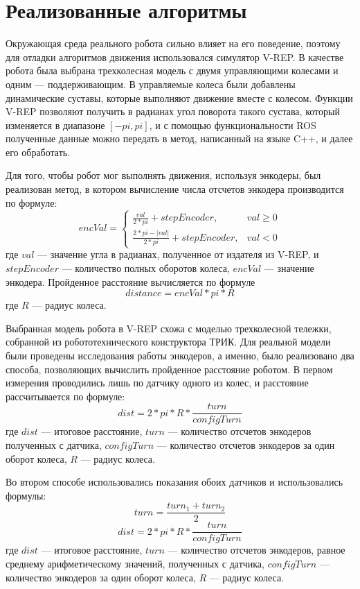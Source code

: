 \documentclass{spisok-article}
\begin{document}
\section{Реализованные алгоритмы}

Окружающая среда реального робота сильно влияет на его поведение, поэтому для отладки алгоритмов движения использовался симулятор V-REP. В качестве робота была выбрана трехколесная модель с двумя управляющими колесами и одним --- поддерживающим. В управляемые колеса  были добавлены динамические суставы, которые выполняют движение вместе с колесом. Функции V-REP позволяют получить в радианах угол поворота такого сустава, который изменяется в диапазоне $[-pi, pi]$, и с помощью функциональности ROS полученные данные можно передать в метод, написанный на языке C++, и далее его обработать. 

Для того, чтобы робот мог выполнять движения, используя энкодеры, был реализован метод, в котором вычисление числа отсчетов энкодера производится по формуле:
\[encVal = \left\{
  \begin{array}{lr}
    \frac{val}{2 * pi} + stepEncoder,               & val \ge 0 \\
    \frac{2 * pi - |val|}{2 * pi} + stepEncoder,  & val < 0
  \end{array}
\right.
\]
где $val$ --- значение угла в радианах, полученное от издателя из V-REP, и $stepEncoder$ --- количество полных оборотов колеса, $encVal$ --- значение энкодера. Пройденное расстояние вычисляется по формуле
$$distance = encVal * pi * R$$
где $R$ --- радиус колеса.

Выбранная модель робота в V-REP схожа с моделью трехколесной тележки, собранной из робототехнического конструктора ТРИК.  Для реальной модели были проведены исследования работы энкодеров, а именно, было реализовано два способа, позволяющих вычислить пройденное расстояние роботом. В первом измерения проводились лишь по датчику одного из колес, и расстояние рассчитывается по формуле:
$$dist = 2 * pi * R * \frac{turn}{configTurn}$$
где $dist$ --- итоговое расстояние, $turn$ --- количество отсчетов энкодеров полученных с датчика, $configTurn$ --- количество отсчетов энкодеров за один оборот колеса, $R$ --- радиус колеса.

Во втором способе использовались показания обоих датчиков и использовались формулы:
$$turn = \frac{turn_1 + turn_2}{2}$$
$$dist = 2 * pi * R * \frac{turn}{configTurn}$$
где $dist$ --- итоговое расстояние, $turn$ --- количество отсчетов энкодеров, равное среднему арифметическому значений, полученных с датчика, $configTurn$ --- количество энкодеров за один оборот колеса, $R$ --- радиус колеса.
\end{document}

